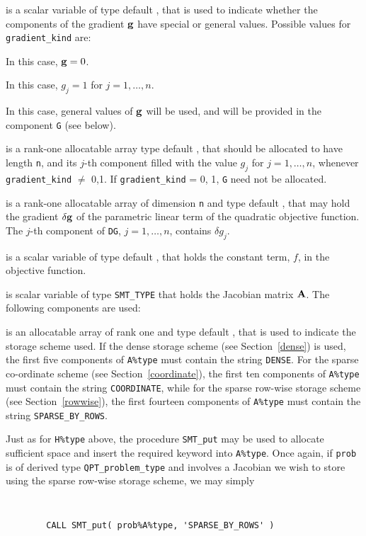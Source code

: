 \documentclass{galahad}
\newcommand{\packagename}{QPT}
\begin{document}
\begin{description}
 is a scalar variable of type default \integer,
that is used to indicate whether the components of the gradient ${\mathbf{g}}$
have special or general values. Possible values for {\tt gradient\_kind} are:
\begin{description}
  In this case, ${\mathbf{g}} = 0$.

 In this case, $g_{j} = 1$ for $j = 1, \ldots , n$.

 In this case, general values of ${\mathbf{g}}$ will be used,
     and will be provided in the component {\tt G} (see below).
\end{description}

 is a rank-one allocatable array type default \realdp, that
should be allocated to have length {\tt n}, and its $j$-th component
filled with the value $g_{j}$ for $j = 1, \ldots , n$,
whenever {\tt gradient\_kind} $\neq$ 0,1.
If {\tt gradient\_kind} {= 0, 1}, {\tt G} need not be allocated.

 is a rank-one allocatable array of dimension {\tt n} and type
default \realdp, that may hold the gradient $\delta {\mathbf{g}}$
of the parametric linear term of the quadratic objective function.
The $j$-th component of
{\tt DG}, $j = 1,  \ldots ,  n$, contains $\delta g_{j}$.

 is a scalar variable of type
default \realdp, that holds
the constant term, $f$, in the objective function.

 is scalar variable of type {\tt SMT\_TYPE}
that holds the Jacobian matrix ${\mathbf{A}}$. The following components are used:

\begin{description}

 is an allocatable array of rank one and type default
\character, that
is used to indicate the storage scheme used. If the dense storage scheme
(see Section~\ref{dense}) is used,
the first five components of {\tt A\%type} must contain the
string {\tt DENSE}.
For the sparse co-ordinate scheme (see Section~\ref{coordinate}),
the first ten components of {\tt A\%type} must contain the
string {\tt COORDINATE}, while
for the sparse row-wise storage scheme (see Section~\ref{rowwise}),
the first fourteen components of {\tt A\%type} must contain the
string {\tt SPARSE\_BY\_ROWS}.

Just as for {\tt H\%type} above, the procedure {\tt SMT\_put}
may be used to allocate sufficient space and insert the required keyword
into {\tt A\%type}.
Once again, if {\tt prob} is of derived type {\tt \packagename\_problem\_type}
and involves a Jacobian we wish to store using the sparse row-wise
storage scheme, we may simply
{\tt
\begin{verbatim}
        CALL SMT_put( prob%A%type, 'SPARSE_BY_ROWS' )
\end{verbatim}
}
\noindent


\end{description}
\end{description}
\end{document}
